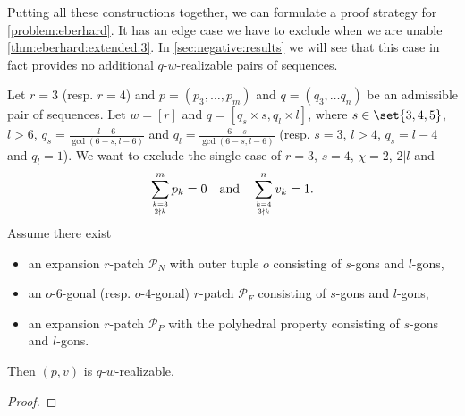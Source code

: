 Putting all these constructions together, we can formulate a proof strategy for \autoref{problem:eberhard}. It has an edge case we have to exclude when we are unable \autoref{thm:eberhard:extended:3}. In \autoref{sec:negative:results} we will see that this case in fact provides no additional $q$-$w$-realizable pairs of sequences.
\begin{proposition}\label{thm:main:const} Let $r = 3$ (resp. $r = 4$) and $p = (p_3, \dots, p_m)$ and $q = (q_3, \dots q_n)$ be an admissible pair of sequences. Let $w = [r]$ and $q = [q_s \times s, q_l \times l]$, where $s \in \set{3, 4, 5}$, $l > 6$, $q_s = \frac{l - 6}{\gcd(6 - s, l - 6)}$ and $q_l = \frac{6 - s}{\gcd(6 - s, l - 6)}$ (resp. $s = 3$, $l > 4$, $q_s = l - 4$ and $q_l = 1$). We want to exclude the single case of $r=3$, $s = 4$, $\chi = 2$, $2 | l$ and
  \begin{align*}
    \sum_{k=3 \atop 2 \nmid k}^{m} p_k = 0 \text{\quad and\quad}\sum_{k=4 \atop 3 \nmid k}^n v_k = 1.
  \end{align*}
Assume there exist
  \begin{itemize}
  \item an expansion $r$-patch $\mathcal{P}_N$ with outer tuple $o$ consisting of $s$-gons and $l$-gons,
  \item an $o$-$6$-gonal (resp. $o$-$4$-gonal) $r$-patch $\mathcal{P}_F$ consisting of $s$-gons and $l$-gons,
  \item an expansion $r$-patch $\mathcal{P}_P$ with the polyhedral property consisting of $s$-gons and $l$-gons.
  \end{itemize}
  Then $(p, v)$ is $q$-$w$-realizable.
  \begin{proof}

\end{proof}
\end{proposition}
